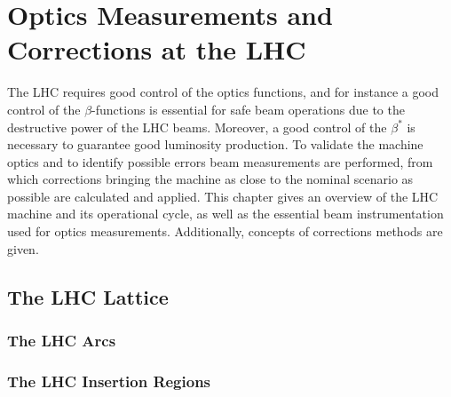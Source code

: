 
\chapter{Optics Measurements and Corrections at the LHC} %

\label{Chapter2} %


The LHC requires good control of the optics functions, and for instance a good control of the \(\beta\)-functions is essential for safe beam operations due to the destructive power of the LHC beams.
Moreover, a good control of the \(\beta^{\ast}\) is necessary to guarantee good luminosity production.
To validate the machine optics and to identify possible errors beam measurements are performed, from which corrections bringing the machine as close to the nominal scenario as possible are calculated and applied. 
This chapter gives an overview of the LHC machine and its operational cycle, as well as the essential beam instrumentation used for optics measurements.
Additionally, concepts of corrections methods are given.




\section{The LHC Lattice}


\subsection{The LHC Arcs}

\subsection{The LHC Insertion Regions}

